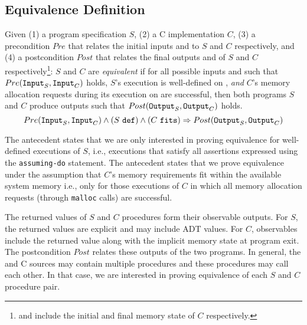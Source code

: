 \subsection{Equivalence Definition}
\label{sec:eqdef}
Given (1) a \SpecL{} program specification $S$, (2) a C implementation $C$,
(3) a precondition $Pre$ that relates the initial inputs  and  to
$S$ and $C$ respectively, and (4) a postcondition $Post$ that relates the final outputs
 and  of $S$ and $C$ respectively\footnote{ and 
include the initial and final memory state of $C$ respectively.}:
$S$ and $C$ are {\em equivalent} if for all possible inputs  and  such that
$Pre({\tt Input}_{S},{\tt Input}_{C})$ holds,
$S$'s execution is well-defined on , {\em and}
$C$'s memory allocation requests during its execution on  are successful,
then both programs $S$ and $C$ produce outputs such that $Post({\tt Output}_{S},{\tt Output}_{C})$ holds.
$$
Pre({\tt Input}_{S},{\tt Input}_{C}) \land {(S\ {\tt def})}{} \land {(C\ {\tt fits})}{} \Rightarrow Post({\tt Output}_{S},{\tt Output}_{C})
$$

The \sdef{} antecedent states that we are only interested in proving equivalence for
well-defined executions of $S$, i.e., executions that satisfy all assertions expressed
using the {\tt assuming-do} statement.
The \cfits{} antecedent states that we prove equivalence under the assumption that $C$'s memory
requirements fit within the available system memory i.e., only for those executions of $C$
in which all memory allocation requests (through {\tt malloc} calls) are successful.

The returned values of $S$ and $C$ procedures form their observable outputs.
For $S$, the returned values are explicit and may include ADT values.
For $C$, observables include the returned value along with the implicit memory state
at program exit.
The postcondition $Post$ relates these outputs of the two programs.
In general, the \SpecL{} and C sources may contain multiple procedures and these
procedures may call each other.
In that case, we are interested in proving equivalence of each $S$ and $C$ procedure pair.

